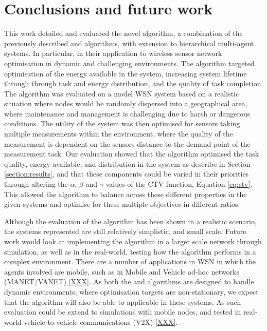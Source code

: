 \section{Conclusions and future work}
\label{section:conclusions}

This work detailed and evaluated the novel \acronymWSNOptimisation{}{} algorithm, a combination of the previously described \acronymATARIA{}{} and \acronymMGRAO{}{} algorithms, with extension to hierarchical multi-agent systems. In particular, in their application to wireless sensor network optimisation in dynamic and challenging environments. The algorithm targeted optimisation of the energy available in the system, increasing system lifetime through through task and energy distribution, and the quality of task completion. The algorithm was evaluated on a model WSN system based on a realistic situation where nodes would be randomly dispersed into a geographical area, where maintenance and management is challenging due to harsh or dangerous conditions. The utility of the system was then optimised for sensors taking multiple measurements within the environment, where the quality of the measurement is dependent on the sensors distance to the demand point of the measurement task. Our evaluation showed that the \acronymWSNOptimisation{}{} algorithm optimised the task quality, energy available, and distribution in the system as describe in Section \ref{section:results}, and that these components could be varied in their priorities through altering the $\alpha$, $\beta$ and $\gamma$ values of the CTV function, Equation \ref{eq:ctv}. This allowed the algorithm to balance across these different properties in the given systems and optimise for these multiple objectives in different ratios. 

Although the evaluation of the algorithm has been shown in a realistic scenario, the systems represented are still relatively simplistic, and small scale. Future work would look at implementing the algorithm in a larger scale network through simulation, as well as in the real-world, testing how the algorithm performs in a complex environment. There are a number of applications in WSN in which the agents involved are mobile, such as in Mobile and Vehicle ad-hoc networks (MANET/VANET) \ref{XXX}. As both the \acronymATARIA{}{} and \acronymMGRAO{}{} algorithms are designed to handle dynamic environments, where optimisation targets are non-stationary, we expect that the \acronymWSNOptimisation{}{} algorithm will also be able to applicable in these systems. As such evaluation could be extend to simulations with mobile nodes, and tested in real-world vehicle-to-vehicle communications (V2X) \ref{XXX}.


  